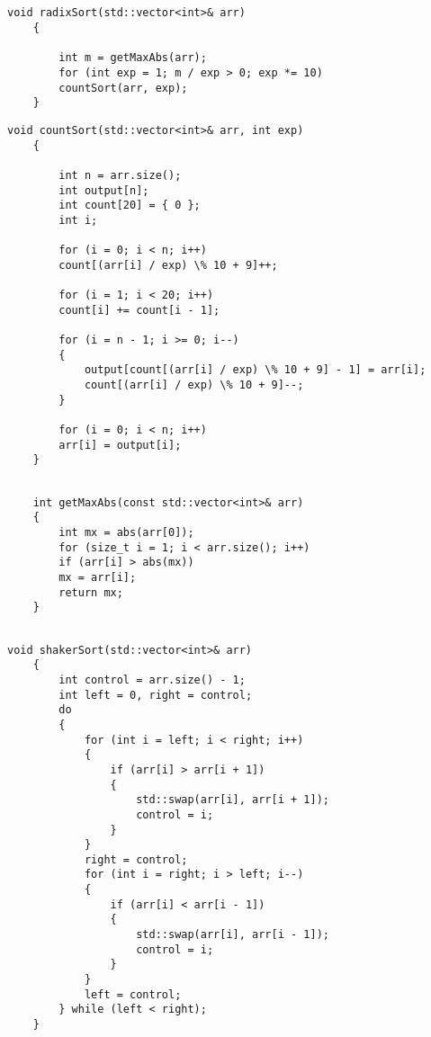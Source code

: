 \begin{appendices}
	\chapter{}
	\begin{lstlisting}[label=lst:radix_sort,caption=Реализация алгоритма поразрядной сортировки]
	void radixSort(std::vector<int>& arr)
	{
		
		int m = getMaxAbs(arr);
		for (int exp = 1; m / exp > 0; exp *= 10)
		countSort(arr, exp);
	}
	\end{lstlisting}
	
	\begin{lstlisting}[label=lst:count_sort,caption=Сортировка подсчетом разрядов чисел]
	void countSort(std::vector<int>& arr, int exp)
	{
		
		int n = arr.size();
		int output[n];
		int count[20] = { 0 };
		int i;
		
		for (i = 0; i < n; i++)
		count[(arr[i] / exp) \% 10 + 9]++;
		
		for (i = 1; i < 20; i++)
		count[i] += count[i - 1];
		
		for (i = n - 1; i >= 0; i--)
		{
			output[count[(arr[i] / exp) \% 10 + 9] - 1] = arr[i];
			count[(arr[i] / exp) \% 10 + 9]--;
		}
		
		for (i = 0; i < n; i++)
		arr[i] = output[i];
	}
	\end{lstlisting}
	
	
	\begin{lstlisting}[label=lst:get_max_abs,caption=Функция поиска максимального значения по модулю в векторе]
	
	int getMaxAbs(const std::vector<int>& arr)
	{
		int mx = abs(arr[0]);
		for (size_t i = 1; i < arr.size(); i++)
		if (arr[i] > abs(mx))
		mx = arr[i];
		return mx;
	}
	
	\end{lstlisting}
	
	
	
	
	
	\begin{lstlisting}[label=lst:shaker_sort,caption=Реализация алгоритма  сортировки перемешиванием]
	void shakerSort(std::vector<int>& arr)
	{
		int control = arr.size() - 1;
		int left = 0, right = control;
		do
		{
			for (int i = left; i < right; i++)
			{
				if (arr[i] > arr[i + 1])
				{
					std::swap(arr[i], arr[i + 1]);
					control = i;
				}
			}
			right = control;
			for (int i = right; i > left; i--)
			{
				if (arr[i] < arr[i - 1])
				{
					std::swap(arr[i], arr[i - 1]);
					control = i;
				}
			}
			left = control;
		} while (left < right);
	}
	\end{lstlisting}
	

\end{appendices}
